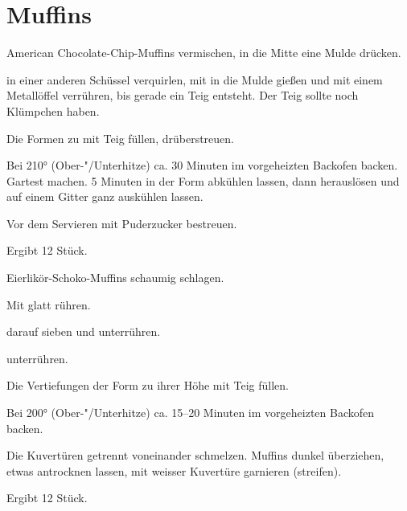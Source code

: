 \section{Muffins}

\begin{recipe}{American Chocolate-Chip-Muffins}
  vermischen, in die Mitte eine Mulde drücken.

  in einer anderen Schüssel verquirlen, mit
  in die Mulde gießen und mit einem Metallöffel verrühren, bis gerade
  ein Teig entsteht. Der Teig sollte noch Klümpchen haben.
  
  Die Formen zu  mit Teig füllen,
  drüberstreuen.

  Bei 210° (Ober-"/Unterhitze) ca. 30 Minuten im vorgeheizten
  Backofen backen. Gartest machen. 5 Minuten in der Form
  abkühlen lassen, dann herauslösen und auf einem Gitter ganz
  auskühlen lassen.

  Vor dem Servieren mit Puderzucker bestreuen.
  
  Ergibt 12 Stück.
\end{recipe}

\begin{recipe}{Eierlikör-Schoko-Muffins}
  schaumig schlagen.

  Mit
  glatt rühren.
  
  darauf sieben und unterrühren.
  
  unterrühren.

  Die Vertiefungen der Form zu  ihrer Höhe mit Teig füllen.
  
  Bei 200° (Ober-"/Unterhitze) ca. 15--20 Minuten im vorgeheizten
  Backofen backen.

  Die Kuvertüren getrennt voneinander schmelzen. Muffins dunkel überziehen,
  etwas antrocknen lassen, mit weisser Kuvertüre garnieren (streifen).

  Ergibt 12 Stück.
\end{recipe}

